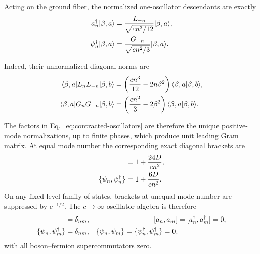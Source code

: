 \documentclass[11pt]{article}
\begin{document}
Acting on the ground fiber, the normalized one-oscillator descendants are
exactly
\begin{align}
 a_n^\dagger|\beta,a\rangle
 &=
 \frac{L_{-n}}{\sqrt{cn^3/12}}|\beta,a\rangle,
 \notag\\
 \psi_n^\dagger|\beta,a\rangle
 &=
 \frac{G_{-n}}{\sqrt{cn^2/3}}|\beta,a\rangle .
 \label{eq:normalized-original-descendants}
\end{align}
\begin{samepage}
Indeed, their unnormalized diagonal norms are
\begin{align}
 \langle\beta,a|L_nL_{-n}|\beta,b\rangle
 &=
 \left(\frac{cn^3}{12}-2n\beta^2\right)
 \langle\beta,a|\beta,b\rangle,
 \notag\\
 \langle\beta,a|G_nG_{-n}|\beta,b\rangle
 &=
 \left(\frac{cn^2}{3}-2\beta^2\right)
 \langle\beta,a|\beta,b\rangle.
 \label{eq:original-mode-large-c-norms}
\end{align}
\end{samepage}
The factors in Eq.~\eqref{eq:contracted-oscillators} are therefore the
unique positive-mode normalizations, up to finite phases, which produce
unit leading Gram matrix.  At equal mode number the corresponding exact
diagonal brackets are
\begin{align}
 [a_n,a_n^\dagger]
 &=1+\frac{24D}{cn^2},
 \notag\\
 \{\psi_n,\psi_n^\dagger\}
 &=1+\frac{6D}{cn^2}.
 \label{eq:contracted-diagonal-finite-c}
\end{align}
On any fixed-level family of states, brackets at unequal mode number are
suppressed by \(c^{-1/2}\).  The \(c\to\infty\) oscillator algebra is
therefore
\begin{align}
 [a_n,a_m^\dagger]&=\delta_{nm},
 & [a_n,a_m]&=[a_n^\dagger,a_m^\dagger]=0,
 \notag\\
 \{\psi_n,\psi_m^\dagger\}&=\delta_{nm},
 & \{\psi_n,\psi_m\}
 =\{\psi_n^\dagger,\psi_m^\dagger\}=0,
 \label{eq:contracted-free-oscillators}
\end{align}
with all boson--fermion supercommutators zero.
\end{document}
